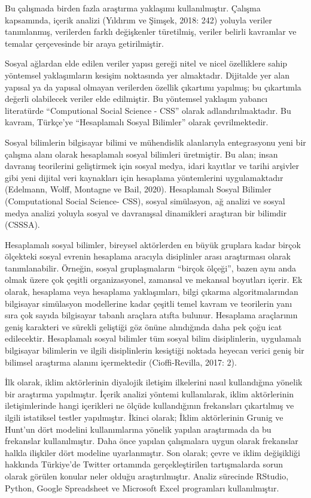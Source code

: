 \documentclass[
]{book}
\begin{document}
Bu çalışmada birden fazla araştırma yaklaşımı kullanılmıştır. Çalışma kapsamında, içerik analizi (Yıldırım ve Şimşek, 2018: 242) yoluyla veriler tanımlanmış, verilerden farklı değişkenler türetilmiş, veriler belirli kavramlar ve temalar çerçevesinde bir araya getirilmiştir.

Sosyal ağlardan elde edilen veriler yapısı gereği nitel ve nicel özelliklere sahip yöntemsel yaklaşımların kesişim noktasında yer almaktadır. Dijitalde yer alan yapısal ya da yapısal olmayan verilerden özellik çıkartımı yapılmış; bu çıkartımla değerli olabilecek veriler elde edilmiştir. Bu yöntemsel yaklaşım yabancı literatürde ``Computional Social Science - CSS'' olarak adlandırılmaktadır. Bu kavram, Türkçe'ye ``Hesaplamalı Sosyal Bilimler'' olarak çevrilmektedir.

Sosyal bilimlerin bilgisayar bilimi ve mühendislik alanlarıyla entegrasyonu yeni bir çalışma alanı olarak hesaplamalı sosyal bilimleri üretmiştir. Bu alan; insan davranış teorilerini geliştirmek için sosyal medya, idari kayıtlar ve tarihi arşivler gibi yeni dijital veri kaynakları için hesaplama yöntemlerini uygulamaktadır (Edelmann, Wolff, Montagne ve Bail, 2020). Hesaplamalı Sosyal Bilimler (Computational Social Science- CSS), sosyal simülasyon, ağ analizi ve sosyal medya analizi yoluyla sosyal ve davranışsal dinamikleri araştıran bir bilimdir (CSSSA).

Hesaplamalı sosyal bilimler, bireysel aktörlerden en büyük gruplara kadar birçok ölçekteki sosyal evrenin hesaplama aracıyla disiplinler arası araştırması olarak tanımlanabilir. Örneğin, sosyal gruplaşmaların ``birçok ölçeği'', bazen aynı anda olmak üzere çok çeşitli organizasyonel, zamansal ve mekansal boyutları içerir. Ek olarak, hesaplama veya hesaplama yaklaşımları, bilgi çıkarma algoritmalarından bilgisayar simülasyon modellerine kadar çeşitli temel kavram ve teorilerin yanı sıra çok sayıda bilgisayar tabanlı araçlara atıfta bulunur. Hesaplama araçlarının geniş karakteri ve sürekli geliştiği göz önüne alındığında daha pek çoğu icat edilecektir. Hesaplamalı sosyal bilimler tüm sosyal bilim disiplinlerin, uygulamalı bilgisayar bilimlerin ve ilgili disiplinlerin kesiştiği noktada heyecan verici geniş bir bilimsel araştırma alanını içermektedir (Cioffi-Revilla, 2017: 2).

İlk olarak, iklim aktörlerinin diyalojik iletişim ilkelerini nasıl kullandığına yönelik bir araştırma yapılmıştır. İçerik analizi yöntemi kullanılarak, iklim aktörlerinin iletişimlerinde hangi içerikleri ne ölçüde kullandığının frekansları çıkartılmış ve ilgili istatiksel testler yapılmıştır. İkinci olarak; İklim aktörlerinin Grunig ve Hunt'un dört modelini kullanımlarına yönelik yapılan araştırmada da bu frekanslar kullanılmıştır. Daha önce yapılan çalışmalara uygun olarak frekanslar halkla ilişkiler dört modeline uyarlanmıştır. Son olarak; çevre ve iklim değişikliği hakkında Türkiye'de Twitter ortamında gerçekleştirilen tartışmalarda sorun olarak görülen konular neler olduğu araştırılmıştır. Analiz sürecinde RStudio, Python, Google Spreadsheet ve Microsoft Excel programları kullanılmıştır.
\end{document}
